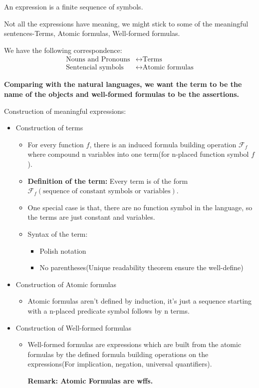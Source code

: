 \documentclass[11pt]{article}
\begin{document}
\begin{definition}[Expression]
An expression is a finite sequence of symbols.
\end{definition}

Not all the expressions have meaning, we might stick to some of the meaningful sentences-Terms, Atomic formulas, Well-formed formulas.

We have the following correspondence:
\begin{align}
\text{Nouns and Pronouns} & \leftrightarrow \text{Terms} \\
\text{Sentencial symbols} & \leftrightarrow \text{Atomic formulas}
\end{align}

\textbf{Comparing with the natural languages, we want the term to be the name of the objects and well-formed formulas to be the assertions.}

Construction of meaningful expressions:
\begin{itemize}
\item Construction of terms
\begin{itemize}
\item For every function \(f\), there is an induced formula building operation \(\mathcal{F}_f\) where compound n variables into one term(for n-placed function symbol \(f\)).
\item \textbf{Definition of the term:} Every term is of the form \(\mathcal{F}_f(\text{sequence of constant symbols or variables})\).
\item One special case is that, there are no function symbol in the language, so the terms are just constant and variables.
\item Syntax of the term:
\begin{itemize}
\item Polish notation
\item No parentheses(Unique readability theorem ensure the well-define)
\end{itemize}
\end{itemize}

\item Construction of Atomic formulas
\begin{itemize}
\item Atomic formulas aren't defined by induction, it's just a sequence starting with a n-placed predicate symbol follows by n terms.
\end{itemize}

\item Construction of Well-formed formulas
\begin{itemize}
\item Well-formed formulas are expressions which are built from the atomic formulas by the defined formula building operations on the expressions(For implication, negation, universal quantifiers).

\textbf{Remark: Atomic Formulas are wffs.}
\end{itemize}
\end{itemize}
\end{document}
